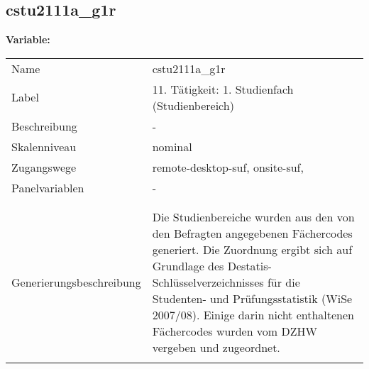 	
	
	\subsection{cstu2111a\_g1r}
	\label{subSection:cstu2111a_g1r}

	\noindent\textbf{Variable:}\\
		\begin{tabular}{lL{11.3cm}}
			\label{tableVariable:cstu2111a_g1r}
			Name & cstu2111a\_g1r \\
			Label & 11. Tätigkeit: 1. Studienfach (Studienbereich) \\
			Beschreibung & - \\
			Skalenniveau & nominal \\
			Zugangswege &
				remote-desktop-suf,
				onsite-suf,
 \\
			Panelvariablen & -
			 \\
			 \\
 \\
					Generierungsbeschreibung & Die Studienbereiche wurden aus den von den Befragten angegebenen Fächercodes generiert. Die Zuordnung ergibt sich auf Grundlage des Destatis-Schlüsselverzeichnisses für die Studenten- und Prüfungsstatistik (WiSe 2007/08). Einige darin nicht enthaltenen Fächercodes wurden vom DZHW vergeben und zugeordnet. 
				 \\	
			 \\
		\end{tabular}






